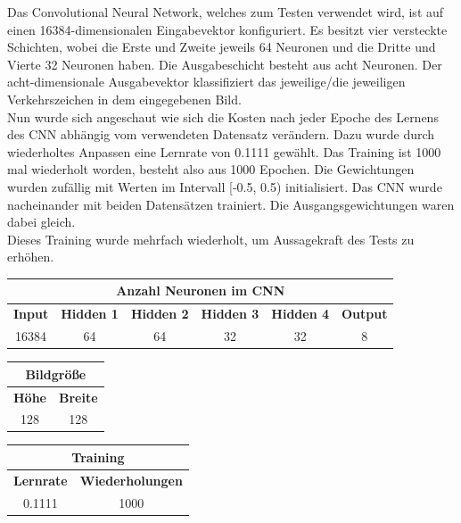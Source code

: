 \documentclass[paper=A4,pagesize=auto,12pt,headinclude=true,footinclude=true,BCOR=0mm,DIV=calc]{scrartcl}
\begin{document}
Das Convolutional Neural Network, welches zum Testen verwendet wird, ist auf einen 16384-dimensionalen Eingabevektor konfiguriert. Es besitzt vier versteckte Schichten, wobei die Erste und Zweite jeweils 64 Neuronen und die Dritte und Vierte 32 Neuronen haben. Die Ausgabeschicht besteht aus acht Neuronen. Der acht-dimensionale Ausgabevektor klassifiziert das jeweilige/die jeweiligen Verkehrszeichen in dem eingegebenen Bild.\\
Nun wurde sich angeschaut wie sich die Kosten nach jeder Epoche des Lernens des CNN abhängig vom verwendeten Datensatz verändern. Dazu wurde durch wiederholtes Anpassen eine Lernrate von 0.1111 gewählt. Das Training ist 1000 mal wiederholt worden, besteht also aus 1000 Epochen. Die Gewichtungen wurden zufällig mit Werten im Intervall [-0.5, 0.5) initialisiert. Das CNN wurde nacheinander mit beiden Datensätzen trainiert. Die Ausgangsgewichtungen waren dabei gleich.\\
Dieses Training wurde mehrfach wiederholt, um Aussagekraft des Tests zu erhöhen.
\begin{center}
	\begin{tabular}{|c|c|c|c|c|c|}
		\hline
		\multicolumn{6}{|c|}{\textbf{Anzahl Neuronen im CNN}}\\ \hline \hline
		\textbf{Input} & \textbf{Hidden 1} & \textbf{Hidden 2} & \textbf{Hidden 3} & \textbf{Hidden 4} & \textbf{Output}\\ \hline
		16384 & 64 & 64 & 32 & 32 & 8\\ \hline
	\end{tabular}
	\vspace{2em}
	\begin{tabular}{|c|c|}
		\hline
		\multicolumn{2}{|c|}{\textbf{Bildgröße}}\\ \hline \hline
		\textbf{Höhe} & \textbf{Breite}\\ \hline
		128 & 128\\ \hline
	\end{tabular}
	\vspace{2em}
	\begin{tabular}{|c|c|}
		\hline
		\multicolumn{2}{|c|}{\textbf{Training}}\\ \hline \hline
		\textbf{Lernrate} & \textbf{Wiederholungen}\\ \hline
		0.1111 & 1000\\ \hline
	\end{tabular}
\end{center}
\end{document}
